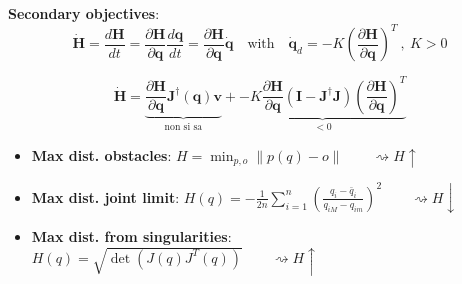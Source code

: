 \vspace*{10pt}
\textbf{Secondary objectives}:
\vspace*{5pt}
$$
\dot{\bm{H}}
=
\frac{d\bm{H}}{dt}
=
\frac{\partial\bm{H}}{\partial \bm{q}} \frac{d\bm{q}}{dt}
=
\frac{\partial\bm{H}}{\partial \bm{q}} \bm{\dot{q}}
\quad
\text{with}
\quad
\dot{\bm{q}}_d = -K(\frac{\partial\bm{H}}{\partial \bm{q}})^T \ , \ K > 0
$$


$$
\dot{\bm{H}}
=
\underbrace{
	\frac{\partial\bm{H}}{\partial \bm{q}} \bm{J}^{\dagger}(\bm{q})\bm{v}
}_{\text{non si sa}}
+
\underbrace{
	-K\frac{\partial\bm{H}}{\partial \bm{q}}(\bm{I} - \bm{J}^\dagger\bm{J})(\frac{\partial\bm{H}}{\partial \bm{q}})^T
}_{<0}
$$

\begin{itemize}
	\item \textbf{Max dist. obstacles}: 
	$
	H = \min_{p,o} \| p(q) - o \| \qquad \rightsquigarrow H\uparrow
	$
	
	\item \textbf{Max dist. joint limit}: 
	$
	H(q)=-{\frac{1}{2n}}\sum_{i=1}^{n}\left({\frac{q_{i}-{\bar{q}}_{i}}{q_{i M}-q_{i m}}}\right)^{2} \qquad \rightsquigarrow H\downarrow
	$

	\item \textbf{Max dist. from singularities}: 
	$
	H(q)=\sqrt{\operatorname*{det}(J(q)J^{T}(q))} \qquad \rightsquigarrow H\uparrow
	$
\end{itemize}




